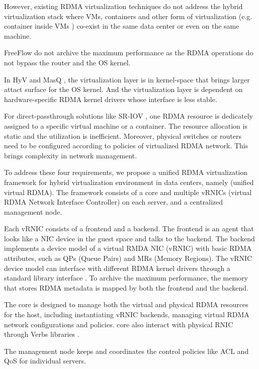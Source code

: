 However, existing RDMA virtualization techniques do not address the hybrid virtualization stack where VMs, containers and other form of virtualization (e.g. container inside VMs \cite{containeronvm}) co-exist in the same data center or even on the same machine.

FreeFlow \cite{kim2019freeflow} do not archive the maximum performance as the RDMA operations do not bypass the router and the OS kernel.

In HyV \cite{pfefferle2015hybrid} and MasQ \cite{he2020masq}, the virtualization layer is in kernel-space that brings larger attact surface for the OS kernel. And the virtualization layer is dependent on hardware-specific RDMA kernel drivers whose interface is less stable.

For direct-passthrough solutions like SR-IOV \cite{sr-iov}, one RDMA resource is dedicately assigned to a specific virtual machine or a container. The resource allocation is static and the utilization is inefficient. Moreover, physical switches or routers need to be configured according to policies of virtualized RDMA network. This brings complexity in network management.

To address these four requirements, we propose a unified RDMA virtualization framework for hybrid virtualization environment in data centers, namely \sys (unified virtual RDMA). The \sys framework consists of a \sys core and multiple vRNICs (virtual RDMA Network Interface Controller) on each server, and a centralized management node.

Each vRNIC consists of a frontend and a backend. The frontend is an agent that looks like a NIC device in the guest space and talks to the backend. The backend implements a device model of a virtual RMDA NIC (vRNIC) with basic RDMA attributes, such as QPs (Queue Pairs) and MRs (Memory Regions). The vRNIC device model can interface with different RDMA kernel drivers through a standard library interface \cite{verbs}. To archive the maximum performance, the memory that stores RDMA metadata is mapped by both the frontend and the backend. 

The \sys core is designed to manage both the virtual and physical RDMA resources for the host, including instantiating vRNIC backends, managing virtual RDMA network configurations and policies. \sys core also interact with physical RNIC through Verbs libraries \cite{verbs}.

The management node keeps and coordinates the control policies like ACL and QoS for individual servers.

